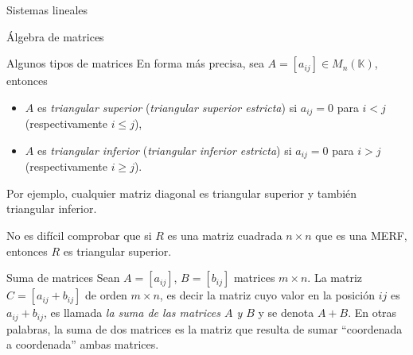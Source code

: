 \documentclass[a4paper,12pt,twoside,spanish,reqno]{amsbook}
\theoremstyle{definition}
\theoremstyle{remark}
\newcommand{\K}{\mathbb K}
\begin{document}
\begin{chapter}{Sistemas lineales}
\begin{section}{Álgebra de matrices}
\begin{subsection}{Algunos tipos de matrices}
                En forma más precisa, sea $A =[a_{ij}]\in M_n(\K)$,  entonces
                \begin{itemize}
                    \item $A$ es \textit{triangular superior} (\textit{triangular superior estricta}) si $a_{ij} =0$ para $i < j$ (respectivamente $i \le j$),
                    \item $A$ es \textit{triangular inferior} (\textit{triangular inferior estricta}) si $a_{ij} =0$ para $i > j$ (respectivamente $i \ge j$).
                \end{itemize}
                
                Por  ejemplo, cualquier matriz diagonal es triangular superior y también triangular inferior. 
                
                No es difícil comprobar que si $R$ es una matriz cuadrada $n \times n$  que es una MERF,  entonces $R$  es triangular superior. 
                
             
            \end{subsection}
            
            
            \begin{subsection}{Suma  de matrices}
                Sean $A=[a_{ij}]$, $B=[b_{ij}]$ matrices  $m \times n$. La matriz $C= [a_{ij} + b_{ij}]$ de orden $m \times n$,  es decir la matriz cuyo valor en la posición $ij$ es  $a_{ij} + b_{ij}$, es llamada \textit{la suma de las matrices $A$ y $B$} y se denota $A+B$. En otras palabras, la suma de dos matrices es la matriz que resulta de sumar ``coordenada a coordenada'' ambas matrices. 
                

\end{subsection}
\end{section}
\end{chapter}
\end{document}
